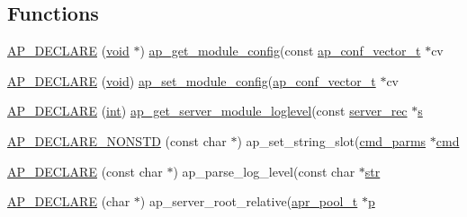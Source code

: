 \subsection*{Functions}
\begin{DoxyCompactItemize}
\item 
\hyperlink{group__APACHE__CORE__CONFIG_ga8ecf6fcf41181528bbfea791523ce968}{A\+P\+\_\+\+D\+E\+C\+L\+A\+RE} (\hyperlink{group__MOD__ISAPI_gacd6cdbf73df3d9eed42fa493d9b621a6}{void} $\ast$) \hyperlink{group__APACHE__CORE__CONFIG_ga1093a5908a384eacc929b028c79f2a02}{ap\+\_\+get\+\_\+module\+\_\+config}(const \hyperlink{group__APACHE__CORE__CONFIG_ga614684670dbf748a70ac6bad272da59c}{ap\+\_\+conf\+\_\+vector\+\_\+t} $\ast$cv
\item 
\hyperlink{group__APACHE__CORE__CONFIG_gafb29753d793511e1b237bc9cc29a2a0c}{A\+P\+\_\+\+D\+E\+C\+L\+A\+RE} (\hyperlink{group__MOD__ISAPI_gacd6cdbf73df3d9eed42fa493d9b621a6}{void}) \hyperlink{group__APACHE__CORE__CONFIG_ga96c3eadc9e6ab6756d05bdcc068a8a10}{ap\+\_\+set\+\_\+module\+\_\+config}(\hyperlink{group__APACHE__CORE__CONFIG_ga614684670dbf748a70ac6bad272da59c}{ap\+\_\+conf\+\_\+vector\+\_\+t} $\ast$cv
\item 
\hyperlink{group__APACHE__CORE__CONFIG_ga7442e418dadd4258c3387e1141055e49}{A\+P\+\_\+\+D\+E\+C\+L\+A\+RE} (\hyperlink{pcre_8txt_a42dfa4ff673c82d8efe7144098fbc198}{int}) \hyperlink{group__APACHE__CORE__CONFIG_ga67ab1a7ba3a416ad831a8952a5accba5}{ap\+\_\+get\+\_\+server\+\_\+module\+\_\+loglevel}(const \hyperlink{structserver__rec}{server\+\_\+rec} $\ast$\hyperlink{pcretest_8txt_a062597889ba244b72877454b1d3adecf}{s}
\item 
\hyperlink{group__APACHE__CORE__CONFIG_ga29adc8abafc9674322e76ff3fba1ac48}{A\+P\+\_\+\+D\+E\+C\+L\+A\+R\+E\+\_\+\+N\+O\+N\+S\+TD} (const char $\ast$) ap\+\_\+set\+\_\+string\+\_\+slot(\hyperlink{group__APACHE__CORE__CONFIG_ga1791fbd28d06a9847bad001541c5241e}{cmd\+\_\+parms} $\ast$\hyperlink{group__apr__thread__proc_ga7b715f5a87a71c6766684c1798251237}{cmd}
\item 
\hyperlink{group__APACHE__CORE__CONFIG_ga5086bde21ce3d63ef541c3a9037536bf}{A\+P\+\_\+\+D\+E\+C\+L\+A\+RE} (const char $\ast$) ap\+\_\+parse\+\_\+log\+\_\+level(const char $\ast$\hyperlink{group__APR__Util__Bucket__Brigades_ga6a62b60443be1d042194af15ce934193}{str}
\item 
\hyperlink{group__APACHE__CORE__CONFIG_ga6301c75017ea986ecf80839e9e1be3f3}{A\+P\+\_\+\+D\+E\+C\+L\+A\+RE} (char $\ast$) ap\+\_\+server\+\_\+root\+\_\+relative(\hyperlink{structapr__pool__t}{apr\+\_\+pool\+\_\+t} $\ast$\hyperlink{group__APACHE__CORE__MPM_ga5cd91701e5c167f2b1a38e70ab57817e}{p}

\end{DoxyCompactItemize}
